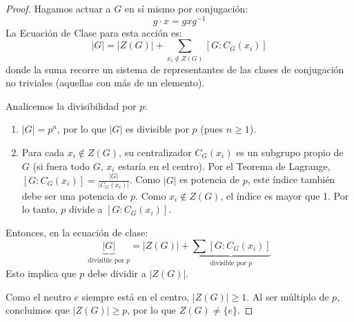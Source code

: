 \begin{proof}
    Hagamos actuar a $G$ en sí mismo por conjugación:
    \begin{equation*}
        g \cdot x = gxg^{-1}
    \end{equation*}
    La Ecuación de Clase para esta acción es:
    \begin{equation*}
        |G| = |Z(G)| + \sum_{x_i \notin Z(G)} [G : C_G(x_i)]
    \end{equation*}
    donde la suma recorre un sistema de representantes de las clases de conjugación no triviales (aquellas con más de un elemento).
    
    Analicemos la divisibilidad por $p$:
    \begin{enumerate}
        \item $|G| = p^n$, por lo que $|G|$ es divisible por $p$ (pues $n \ge 1$).
        \item Para cada $x_i \notin Z(G)$, su centralizador $C_G(x_i)$ es un subgrupo propio de $G$ (si fuera todo $G$, $x_i$ estaría en el centro).
        Por el Teorema de Lagrange, $[G : C_G(x_i)] = \frac{|G|}{|C_G(x_i)|}$.
        Como $|G|$ es potencia de $p$, este índice también debe ser una potencia de $p$.
        Como $x_i \notin Z(G)$, el índice es mayor que 1. Por lo tanto, $p$ divide a $[G : C_G(x_i)]$.
    \end{enumerate}
    
    Entonces, en la ecuación de clase:
    \begin{equation*}
        \underbrace{|G|}_{\text{divisible por } p} = |Z(G)| + \underbrace{\sum [G : C_G(x_i)]}_{\text{divisible por } p}
    \end{equation*}
    Esto implica que $p$ debe dividir a $|Z(G)|$.
    
    Como el neutro $e$ siempre está en el centro, $|Z(G)| \ge 1$.
    Al ser múltiplo de $p$, concluimos que $|Z(G)| \ge p$, por lo que $Z(G) \neq \{e\}$.
\end{proof}
